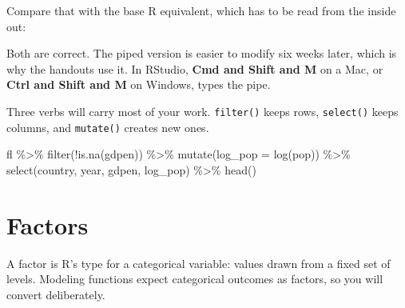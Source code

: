 \documentclass[
  a4paper,
]{scrbook}
\newenvironment{Shaded}{\begin{snugshade}}{\end{snugshade}}
\newcommand{\AttributeTok}[1]{\textcolor[rgb]{0.40,0.45,0.13}{#1}}
\newcommand{\CommentTok}[1]{\textcolor[rgb]{0.37,0.37,0.37}{#1}}
\newcommand{\DecValTok}[1]{\textcolor[rgb]{0.68,0.00,0.00}{#1}}
\newcommand{\FunctionTok}[1]{\textcolor[rgb]{0.28,0.35,0.67}{#1}}
\newcommand{\NormalTok}[1]{\textcolor[rgb]{0.00,0.23,0.31}{#1}}
\newcommand{\OtherTok}[1]{\textcolor[rgb]{0.00,0.23,0.31}{#1}}
\newcommand{\SpecialCharTok}[1]{\textcolor[rgb]{0.37,0.37,0.37}{#1}}
\newcommand{\StringTok}[1]{\textcolor[rgb]{0.13,0.47,0.30}{#1}}
\begin{document}
Compare that with the base R equivalent, which has to be read from the
inside out:

\begin{Shaded}
\end{Shaded}

Both are correct. The piped version is easier to modify six weeks later,
which is why the handouts use it. In RStudio, \textbf{Cmd and Shift and
M} on a Mac, or \textbf{Ctrl and Shift and M} on Windows, types the
pipe.

Three verbs will carry most of your work. \texttt{filter()} keeps rows,
\texttt{select()} keeps columns, and \texttt{mutate()} creates new ones.

\begin{Shaded}
\begin{Highlighting}[]
\NormalTok{fl }\SpecialCharTok{\%\textgreater{}\%}
  \FunctionTok{filter}\NormalTok{(}\SpecialCharTok{!}\FunctionTok{is.na}\NormalTok{(gdpen)) }\SpecialCharTok{\%\textgreater{}\%}
  \FunctionTok{mutate}\NormalTok{(}\AttributeTok{log\_pop =} \FunctionTok{log}\NormalTok{(pop)) }\SpecialCharTok{\%\textgreater{}\%}
  \FunctionTok{select}\NormalTok{(country, year, gdpen, log\_pop) }\SpecialCharTok{\%\textgreater{}\%}
  \FunctionTok{head}\NormalTok{()}
\end{Highlighting}
\end{Shaded}

\section*{Factors}\label{factors}


A factor is R's type for a categorical variable: values drawn from a
fixed set of levels. Modeling functions expect categorical outcomes as
factors, so you will convert deliberately.

\begin{Shaded}
\end{Shaded}
\end{document}
